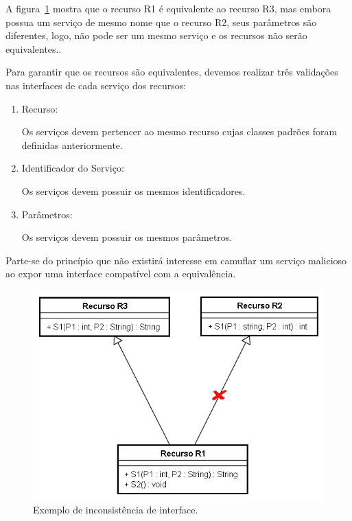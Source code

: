 	A figura~\ref{fig:consistenciaInterface} mostra que o recurso R1 é equivalente ao recurso R3, mas embora possua um serviço de mesmo nome que o recurso R2,  seus parâmetros são diferentes, logo, não pode ser um mesmo serviço e os recursos não serão equivalentes..
	
	Para garantir que os recursos são equivalentes, devemos realizar três validações nas interfaces de cada serviço dos recursos:
	\begin{enumerate}
		\item Recurso:
			
			Os serviços devem pertencer ao mesmo recurso cujas classes padrões foram definidas anteriormente.
		
		\item Identificador do Serviço:

			Os serviços devem possuir os mesmos identificadores.

		\item Parâmetros:

			Os serviços devem possuir os mesmos parâmetros.
	\end{enumerate}

	Parte-se do princípio que não existirá interesse em camuflar um serviço malicioso ao expor uma interface compatível com a equivalência.

\begin{figure}[ht]
	\center
	\includegraphics[scale=0.8]{imagens/consistenciaInterface}
	\caption{Exemplo de inconsistência de interface.}
	\label{fig:consistenciaInterface}
\end{figure}

